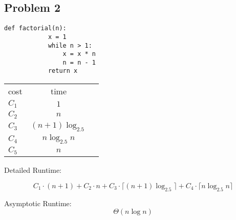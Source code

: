 \documentclass{article}
\begin{document}
\subsection*{Problem 2}
\begin{multicols}{2}
    \begin{lstlisting}[firstnumber=0]
        def factorial(n):
            x = 1
            while n > 1:
                x = x * n
                n = n - 1
            return x
    \end{lstlisting}
    \columnbreak
    \footnotesize
    \begin{tabular}{lcc}
        cost  & time                 \\
        $C_1$ & $1$                  \\
        $C_2$ & $n$                  \\
        $C_3$ & $(n + 1) \log_{2.5}$ \\
        $C_4$ & $n \log_{2.5} n$     \\
        $C_5$ & $n$                  \\
    \end{tabular}
\end{multicols}

Detailed Runtime:

\begin{equation*}
    C_1 \cdot (n + 1) + C_2 \cdot n + C_3 \cdot \lceil (n+1) \log_{2.5} \rceil + C_4 \cdot \lceil n \log_{2.5}n \rceil
\end{equation*}

Asymptotic Runtime:
\begin{equation*}
    \Theta(n \log n)
\end{equation*}
\end{document}
